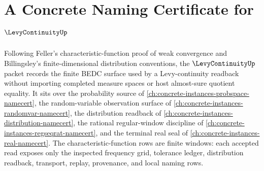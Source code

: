 \chapter{A Concrete Naming Certificate for $\LevyContinuityUp$}
\label{ch:concrete-instances-levy-continuity-namecert}

Following Feller's characteristic-function proof of weak convergence and Billingsley's finite-dimensional distribution conventions, the $\LevyContinuityUp$ packet records the finite BEDC surface used by a Levy-continuity readback without importing completed measure spaces or host almost-sure quotient equality. It sits over the probability source of \autoref{ch:concrete-instances-probspace-namecert}, the random-variable observation surface of \autoref{ch:concrete-instances-randomvar-namecert}, the distribution readback of \autoref{ch:concrete-instances-distribution-namecert}, the rational regular-window discipline of \autoref{ch:concrete-instances-regseqrat-namecert}, and the terminal real seal of \autoref{ch:concrete-instances-real-namecert}. The characteristic-function rows are finite windows: each accepted read exposes only the inspected frequency grid, tolerance ledger, distribution readback, transport, replay, provenance, and local naming rows.

